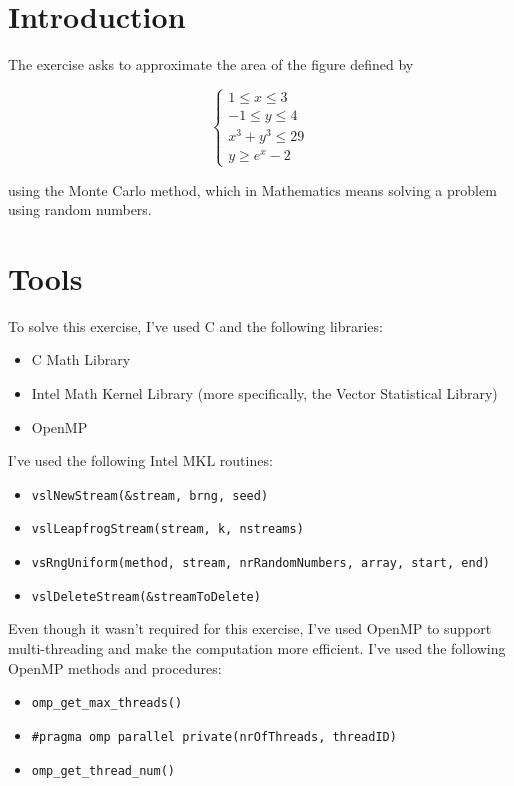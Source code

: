 \documentclass{article}
\newcommand{\code}{\texttt}
\begin{document}
\section{Introduction}\label{sec:intro}
The exercise asks to approximate the area of the figure defined by

$$
\begin{cases}
1 \le x \le 3 \\
-1\le y \le 4 \\  
x^3+y^3\le 29 \\
y \ge e^x -2
\end{cases}$$

using the Monte Carlo method, which in Mathematics means solving a problem using random numbers.

\section{Tools}
To solve this exercise, I've used C and the following libraries:

\begin{itemize}
  \item C Math Library
  \item Intel Math Kernel Library (more specifically, the Vector Statistical Library)
  \item OpenMP
\end{itemize}

I've used the following Intel MKL routines:
\begin{itemize}
  \item \code{vslNewStream(\&stream, brng, seed)}
  \item \code{vslLeapfrogStream(stream, k, nstreams)}
  \item \code{vsRngUniform(method, stream, nrRandomNumbers, array, start, end)}
  \item \code{vslDeleteStream(\&streamToDelete)}
\end{itemize}

Even though it wasn't required for this exercise, I've used OpenMP to support multi-threading and make the computation more efficient. I've used the following OpenMP methods and procedures:
\begin{itemize}
  \item \code{omp\_get\_max\_threads()}
  \item \code{\#pragma omp parallel private(nrOfThreads, threadID)}
  \item \code{omp\_get\_thread\_num()}
\end{itemize}
\end{document}
